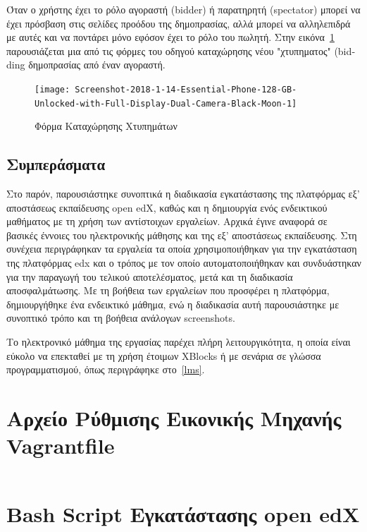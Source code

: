 \documentclass[12pt]{report}
\begin{document}
Όταν ο χρήστης έχει το ρόλο αγοραστή (\textlatin{bidder}) ή παρατηρητή (\textlatin{spectator}) μπορεί να έχει πρόσβαση στις σελίδες προόδου της δημοπρασίας, αλλά μπορεί να αλληλεπιδρά με αυτές και να ποντάρει μόνο εφόσον έχει το ρόλο του πωλητή. Στην εικόνα~\ref{fig:auction_bid} παρουσιάζεται μια από τις φόρμες του οδηγού καταχώρησης νέου "χτυπηματος" (\textlatin{bidding} δημοπρασίας από έναν αγοραστή.
\begin{figure}[H]
\centering
\texttt{[image: Screenshot-2018-1-14-Essential-Phone-128-GB-Unlocked-with-Full-Display-Dual-Camera-Black-Moon-1]}
\caption{Φόρμα Καταχώρησης Χτυπημάτων}
\label{fig:auction_bid}
\end{figure}

\section{Συμπεράσματα}
Στο παρόν, παρουσιάστηκε συνοπτικά η διαδικασία εγκατάστασης της πλατφόρμας εξ' αποστάσεως εκπαίδευσης \textlatin{open edX}, καθώς και η δημιουργία ενός ενδεικτικού μαθήματος με τη χρήση των αντίστοιχων εργαλείων. Αρχικά έγινε αναφορά σε βασικές έννοιες του ηλεκτρονικής μάθησης και της εξ' αποστάσεως εκπαίδευσης. Στη συνέχεια περιγράφηκαν τα εργαλεία τα οποία χρησιμοποιήθηκαν για την εγκατάσταση της πλατφόρμας \textlatin{edx} και ο τρόπος με τον οποίο αυτοματοποιήθηκαν και συνδυάστηκαν για την παραγωγή του τελικού αποτελέσματος, μετά και τη διαδικασία αποσφαλμάτωσης. Με τη βοήθεια των εργαλείων που προσφέρει η πλατφόρμα, δημιουργήθηκε ένα ενδεικτικό μάθημα, ενώ η διαδικασία αυτή παρουσιάστηκε με συνοπτικό τρόπο και τη βοήθεια ανάλογων \textlatin{screenshots}.

Το ηλεκτρονικό μάθημα της εργασίας παρέχει πλήρη λειτουργικότητα, η οποία είναι εύκολο να επεκταθεί με τη χρήση έτοιμων \textlatin{XBlocks} ή με σενάρια σε γλώσσα προγραμματισμού, όπως περιγράφηκε στο~\ref{lms}.

\begin{appendices}
\chapter{Αρχείο Ρύθμισης Εικονικής Μηχανής \textlatin{Vagrantfile}}\label{AppA}
\inputminted[linenos, fontsize=\scriptsize, breaklines, baselinestretch=1]{ruby}{sources/Vagrantfile}
\chapter{\textlatin{Bash Script} Εγκατάστασης \textlatin{open edX}}\label{AppB}
\inputminted[linenos, fontsize=\scriptsize, breaklines, baselinestretch=1]{bash}{sources/install_edx.sh}
\end{appendices}

\appendix



\end{document}
